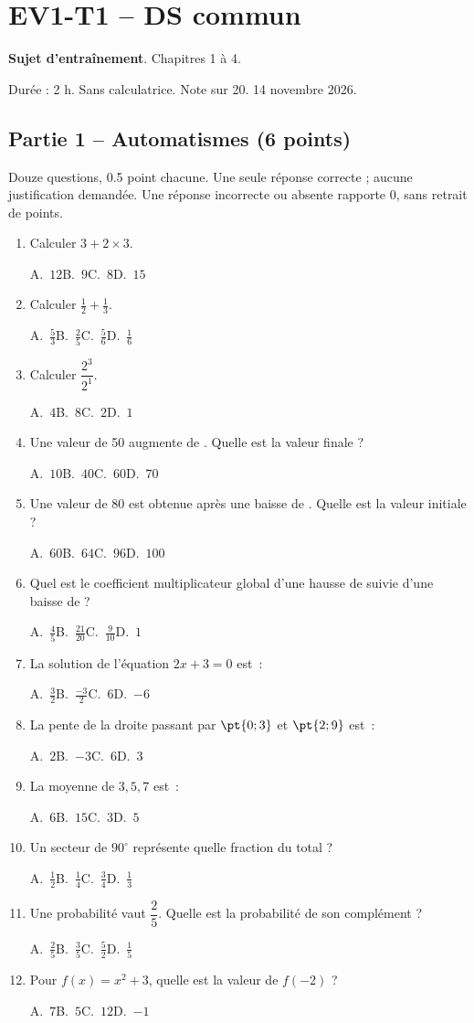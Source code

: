\mxnewpage\section*{EV1-T1 -- DS commun}\label{EV1-T1}
\textbf{Sujet d’entraînement}. Chapitres 1 à 4.\par Durée : 2 h. Sans calculatrice. Note sur 20. 14 novembre 2026.
\subsection*{Partie 1 -- Automatismes (6 points)}
Douze questions, \num{0,5} point chacune. Une seule réponse correcte ; aucune justification demandée. Une réponse incorrecte ou absente rapporte 0, sans retrait de points.
\begin{enumerate}
\item Calculer $3+2\times3$.\par A.~$12$\quad B.~$9$\quad C.~$8$\quad D.~$15$
\item Calculer $\frac12+\frac13$.\par A.~$\frac{5}{3}$\quad B.~$\frac{2}{5}$\quad C.~$\frac{5}{6}$\quad D.~$\frac{1}{6}$
\item Calculer $\dfrac{2^3}{2^{1}}$.\par A.~$4$\quad B.~$8$\quad C.~$2$\quad D.~$1$
\item Une valeur de 50 augmente de . Quelle est la valeur finale ?\par A.~$10$\quad B.~$40$\quad C.~$60$\quad D.~$70$
\item Une valeur de 80 est obtenue après une baisse de . Quelle est la valeur initiale ?\par A.~$60$\quad B.~$64$\quad C.~$96$\quad D.~$100$
\item Quel est le coefficient multiplicateur global d'une hausse de  suivie d'une baisse de  ?\par A.~$\frac{4}{5}$\quad B.~$\frac{21}{20}$\quad C.~$\frac{9}{10}$\quad D.~$1$
\item La solution de l'équation $2x+3=0$ est~:\par A.~$\frac{3}{2}$\quad B.~$\frac{-3}{2}$\quad C.~$6$\quad D.~$-6$
\item La pente de la droite passant par $\pt{0;3}$ et $\pt{2;9}$ est~:\par A.~$2$\quad B.~$-3$\quad C.~$6$\quad D.~$3$
\item La moyenne de $3, 5, 7$ est~:\par A.~$6$\quad B.~$15$\quad C.~$3$\quad D.~$5$
\item Un secteur de $90^\circ$ représente quelle fraction du total ?\par A.~$\frac{1}{2}$\quad B.~$\frac{1}{4}$\quad C.~$\frac{3}{4}$\quad D.~$\frac{1}{3}$
\item Une probabilité vaut $\dfrac{2}{5}$. Quelle est la probabilité de son complément ?\par A.~$\frac{2}{5}$\quad B.~$\frac{3}{5}$\quad C.~$\frac{5}{2}$\quad D.~$\frac{1}{5}$
\item Pour $f(x)=x^2+3$, quelle est la valeur de $f(-2)$ ?\par A.~$7$\quad B.~$5$\quad C.~$12$\quad D.~$-1$
\end{enumerate}
